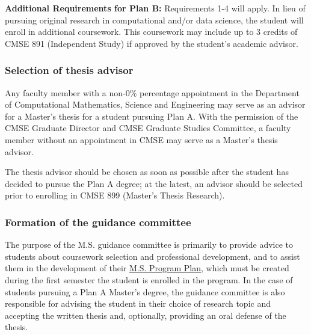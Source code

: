 \vspace{3mm}
\noindent
\textbf{Additional Requirements for Plan B:} Requirements 1-4 will
apply. In lieu of pursuing original research in computational and/or
data science, the student will enroll in additional coursework. This
coursework may include up to 3 credits of CMSE 891 (Independent Study)
if approved by the student’s academic advisor. 


\subsubsection{Selection of thesis advisor}

Any faculty member with a non-0\% percentage appointment in the
Department of Computational Mathematics, Science and Engineering may
serve as an advisor for a Master's thesis for a student pursuing Plan
A.  With the permission of the CMSE Graduate Director and CMSE
Graduate Studies Committee, a faculty member without an appointment in
CMSE may serve as a Master's thesis advisor.  

The thesis advisor should be
chosen as soon as possible after the student has decided to pursue the
Plan A degree; at the latest, an advisor should be selected prior to
enrolling in CMSE 899 (Master's Thesis Research).  


\subsubsection{Formation of the guidance committee}
\label{sec:ms_guidance_comm}

The purpose of the M.S. guidance committee is primarily to provide
advice to students about coursework selection and professional
development, and to assist them in the development of their
\href{https://www.egr.msu.edu/grs/}{M.S. Program Plan}, which must be
created during the first semester the student is enrolled in the
program.  In the case of students pursuing a Plan A Master's degree,
the guidance committee is also responsible for advising the student in
their choice of research topic and accepting the written thesis and,
optionally, providing an oral defense of the thesis.

